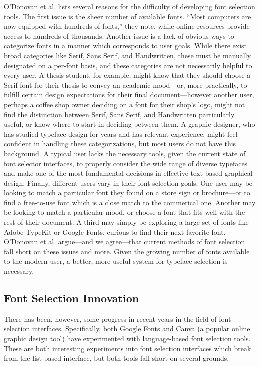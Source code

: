 O'Donovan et al. \cite{odonovan2014} lists several reasons for the difficulty of developing font selection tools. The first issue is the sheer number of available fonts. ``Most computers are now equipped with hundreds of fonts,'' they note, while online resources provide access to hundreds of thousands. Another issue is a lack of obvious ways to categorize fonts in a manner which corresponds to user goals. While there exist broad categories like Serif, Sans Serif, and Handwritten, these must be manually designated on a per-font basis, and these categories are not necessarily helpful to every user. A thesis student, for example, might know that they should choose a Serif font for their thesis to convey an academic mood—or, more practically, to fulfill certain design expectations for their final document—however another user, perhaps a coffee shop owner deciding on a font for their shop's logo, might not find the distinction between Serif, Sans Serif, and Handwritten particularly useful, or know where to start in deciding between them. A graphic designer, who has studied typeface design for years and has relevant experience, might feel confident in handling these categorizations, but most users do not have this background. A typical user lacks the necessary tools, given the current state of font selector interfaces, to properly consider the wide range of diverse typefaces and make one of the most fundamental decisions in effective text-based graphical design. Finally, different users vary in their font selection goals. One user may be looking to match a particular font they found on a store sign or brochure—or to find a free-to-use font which is a close match to the commerical one. Another may be looking to match a particular mood, or choose a font that fits well with the rest of their document. A third may simply be exploring a large set of fonts like Adobe TypeKit or Google Fonts, curious to find their next favorite font. O'Donovan et al. argue—and we agree—that current methods of font selection fall short on these issues and more. Given the growing number of fonts available to the modern user, a better, more useful system for typeface selection is necessary.

\subsection{Font Selection Innovation}

There has been, however, some progress in recent years in the field of font selection interfaces. Specifically, both Google Fonts and Canva (a popular online graphic design tool) have experimented with language-based font selection tools. These are both interesting experiments into font selection interfaces which break from the list-based interface, but both tools fall short on several grounds.

